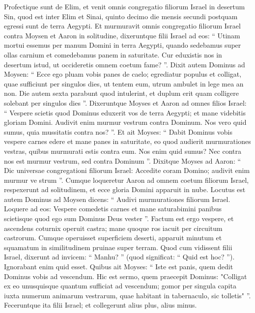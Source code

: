 \begin{biblechapter}
\begin{biblechapter}
\begin{biblechapter}
\begin{biblechapter}
\begin{biblechapter}
\begin{biblechapter}
\begin{biblechapter}
\begin{biblechapter}
\begin{biblechapter}
\begin{biblechapter}
\begin{biblechapter}
\begin{biblechapter}
\begin{biblechapter}
\begin{biblechapter}
\begin{biblechapter}
\begin{biblechapter}
\verse Profectique sunt de Elim, et venit omnis congregatio filiorum Israel in desertum Sin, quod est inter Elim et Sinai, quinto decimo die mensis secundi postquam egressi sunt de terra Aegypti.
 \verse Et murmuravit omnis congregatio filiorum Israel contra Moysen et Aaron in solitudine, 
\verse dixeruntque filii Israel ad eos: “ Utinam mortui essemus per manum Domini in terra Aegypti, quando sedebamus super ollas carnium et comedebamus panem in saturitate. Cur eduxistis nos in desertum istud, ut occideretis omnem coetum fame? ”.
 \verse Dixit autem Dominus ad Moysen: “ Ecce ego pluam vobis panes de caelo; egrediatur populus et colligat, quae sufficiunt per singulos dies, ut tentem eum, utrum ambulet in lege mea an non. 
\verse Die autem sexta parabunt quod intulerint, et duplum erit quam colligere solebant per singulos dies ”.
 \verse Dixeruntque Moyses et Aaron ad omnes filios Israel:
 “ Vespere scietis
 quod Dominus eduxerit vos
 de terra Aegypti;
 \verse et mane videbitis
 gloriam Domini.
 Audivit enim murmur vestrum contra Dominum. Nos vero quid sumus, quia mussitatis contra nos? ”.
 \verse Et ait Moyses:
 “ Dabit Dominus vobis
 vespere carnes edere
 et mane panes in saturitate,
 eo quod audierit murmurationes vestras, quibus murmurati estis contra eum. Nos enim quid sumus? Nec contra nos est murmur vestrum, sed contra Dominum ”.
 \verse Dixitque Moyses ad Aaron: “ Dic universae congregationi filiorum Israel: Accedite coram Domino; audivit enim murmur ve strum ”. 
\verse Cumque loqueretur Aaron ad omnem coetum filiorum Israel, respexerunt ad solitudinem, et ecce gloria Domini apparuit in nube. 
\verse Locutus est autem Dominus ad Moysen dicens: 
\verse “ Audivi murmurationes filiorum Israel. Loquere ad eos: Vespere comedetis carnes et mane saturabimini panibus scietisque quod ego sum Dominus Deus vester ”.
 \verse Factum est ergo vespere, et ascendens coturnix operuit castra; mane quoque ros iacuit per circuitum castrorum.
 \verse Cumque operuisset superficiem deserti, apparuit minutum et squamatum in similitudinem pruinae super terram. 
\verse Quod cum vidissent filii Israel, dixerunt ad invicem: “ Manhu? ” (quod significat: “ Quid est hoc? ”). Ignorabant enim quid esset. Quibus ait Moyses: “ Iste est panis, quem dedit Dominus vobis ad vescendum. 
\verse Hic est sermo, quem praecepit Dominus: "Colligat ex eo unusquisque quantum sufficiat ad vescendum; gomor per singula capita iuxta numerum animarum vestrarum, quae habitant in tabernaculo, sic tolletis" ”. 
\verse Feceruntque ita filii Israel; et collegerunt alius plus, alius minus. 

\end{biblechapter}
\end{biblechapter}
\end{biblechapter}
\end{biblechapter}
\end{biblechapter}
\end{biblechapter}
\end{biblechapter}
\end{biblechapter}
\end{biblechapter}
\end{biblechapter}
\end{biblechapter}
\end{biblechapter}
\end{biblechapter}
\end{biblechapter}
\end{biblechapter}
\end{biblechapter}
